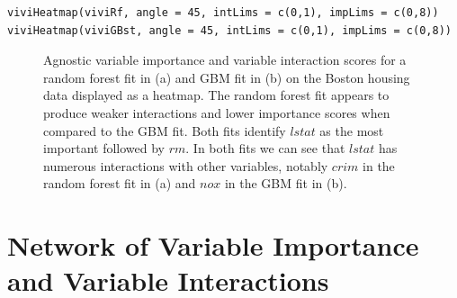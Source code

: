 \begin{verbatim}
viviHeatmap(viviRf, angle = 45, intLims = c(0,1), impLims = c(0,8))
viviHeatmap(viviGBst, angle = 45, intLims = c(0,1), impLims = c(0,8))
\end{verbatim}

\begin{figure}

{\centering {}

}

\caption{Agnostic variable importance and variable interaction scores for a random forest fit in (a) and GBM fit in (b) on the Boston housing data displayed as a heatmap. The random forest fit appears to produce weaker interactions and lower importance scores when compared to the GBM fit. Both fits identify $lstat$ as the most important followed by $rm$. In both fits we can see that $lstat$ has numerous interactions with other variables, notably $crim$ in the random forest fit in (a) and $nox$ in the GBM fit in (b).}\label{fig:heatmaps}
\end{figure}

\hypertarget{networkSec}{%
\section{Network of Variable Importance and Variable Interactions}\label{networkSec}}

